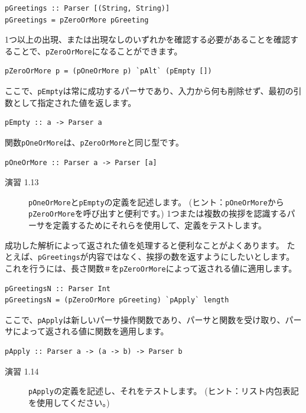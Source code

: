 \documentclass{jbook}
\begin{document}
\begin{verbatim}
pGreetings :: Parser [(String, String)]
pGreetings = pZeroOrMore pGreeting
\end{verbatim}

1つ以上の出現、または出現なしのいずれかを確認する必要があることを確認することで、\texttt{pZeroOrMore}になることができます。

\begin{verbatim}
pZeroOrMore p = (pOneOrMore p) `pAlt` (pEmpty [])
\end{verbatim}

ここで、\texttt{pEmpty}は常に成功するパーサであり、入力から何も削除せず、最初の引数として指定された値を返します。

\begin{verbatim}
pEmpty :: a -> Parser a
\end{verbatim}

関数\texttt{pOneOrMore}は、\texttt{pZeroOrMore}と同じ型です。

\begin{verbatim}
pOneOrMore :: Parser a -> Parser [a]
\end{verbatim}

\begin{description}
	\item[演習 1.13] \texttt{pOneOrMore}と\texttt{pEmpty}の定義を記述します。
		(ヒント：\texttt{pOneOrMore}から\texttt{pZeroOrMore}を呼び出すと便利です。)
		1つまたは複数の挨拶を認識するパーサを定義するためにそれらを使用して、定義をテストします。
\end{description}

成功した解析によって返された値を処理すると便利なことがよくあります。
たとえば、\texttt{pGreetings}が内容ではなく、挨拶の数を返すようにしたいとします。
これを行うには、長さ関数\texttt{＃}を\texttt{pZeroOrMore}によって返される値に適用します。

\begin{verbatim}
pGreetingsN :: Parser Int
pGreetingsN = (pZeroOrMore pGreeting) `pApply` length
\end{verbatim}

ここで、\texttt{pApply}は新しいパーサ操作関数であり、パーサと関数を受け取り、パーサによって返される値に関数を適用します。

\begin{verbatim}
pApply :: Parser a -> (a -> b) -> Parser b
\end{verbatim}

\begin{description}
	\item[演習 1.14] \texttt{pApply}の定義を記述し、それをテストします。
		(ヒント：リスト内包表記を使用してください。)
\end{description}
\end{document}
